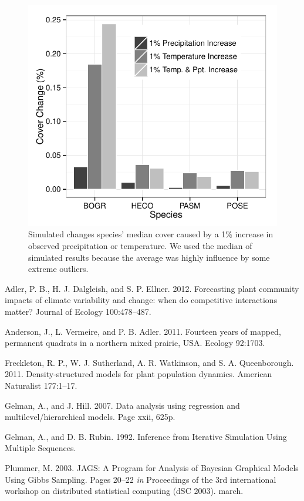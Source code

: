 \documentclass[12pt,]{article}
\begin{document}
\begin{figure}[htbp]
\centering
\includegraphics{components/figure/manuscript-figure_4.pdf}
\caption{Simulated changes species' median cover caused by a 1\%
increase in observed precipitation or temperature. We used the median of
simulated results because the average was highly influence by some
extreme outliers.}
\end{figure}

Adler, P. B., H. J. Dalgleish, and S. P. Ellner. 2012. Forecasting plant
community impacts of climate variability and change: when do competitive
interactions matter? Journal of Ecology 100:478--487.

Anderson, J., L. Vermeire, and P. B. Adler. 2011. Fourteen years of
mapped, permanent quadrats in a northern mixed prairie, USA. Ecology
92:1703.

Freckleton, R. P., W. J. Sutherland, A. R. Watkinson, and S. A.
Queenborough. 2011. Density-structured models for plant population
dynamics. American Naturalist 177:1--17.

Gelman, A., and J. Hill. 2007. Data analysis using regression and
multilevel/hierarchical models. Page xxii, 625p.

Gelman, A., and D. B. Rubin. 1992. Inference from Iterative Simulation
Using Multiple Sequences.

Plummer, M. 2003. JAGS: A Program for Analysis of Bayesian Graphical
Models Using Gibbs Sampling. Pages 20--22 \emph{in} Proceedings of the
3rd international workshop on distributed statistical computing (dSC
2003). march.
\end{document}
